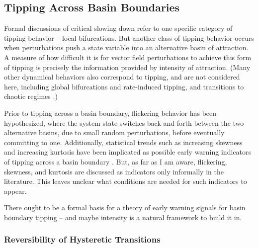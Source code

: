 


\subsection{Tipping Across Basin Boundaries}

Formal discussions of critical slowing down refer to one specific category of tipping behavior – local bifurcations. But another class of tipping behavior occurs when perturbations push a state variable into an alternative basin of attraction. A measure of how difficult it is for vector field perturbations to achieve this form of tipping is precisely the information provided by intensity of attraction. (Many other dynamical behaviors also correspond to tipping, and are not considered here, including global bifurcations and rate-induced tipping, and transitions to chaotic regimes \cite{ashwinTippingPointsOpen2012}.)

Prior to tipping across a basin boundary, flickering behavior has been hypothesized, where the system state switches back and forth between the two alternative basins, due to small random perturbations, before eventually committing to one. Additionally, statistical trends such as increasing skewness and increasing kurtosis have been implicated as possible early warning indicators of tipping across a basin boundary \cite{schefferCriticalTransitionsNature2009}. But, as far as I am aware, flickering, skewness, and kurtosis are discussed as indicators only informally in the literature. This leaves unclear what conditions are needed for such indicators to appear.

There ought to be a formal basis for a theory of early warning signals for basin boundary tipping -- and maybe intensity is a natural framework to build it in.

\subsubsection{Reversibility of Hysteretic Transitions}

